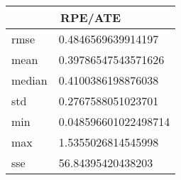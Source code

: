 \begin{table}[!ht] 
 \centering 
 \begin{tabular}{|l|l|} \hline 
 \multicolumn{2}{|c|}{RPE/ATE} \\ \hline 
 rmse & 0.4846569639914197 \\ \hline 
mean & 0.39786547543571626 \\ \hline 
median & 0.4100386198876038 \\ \hline 
std & 0.2767588051023701 \\ \hline 
min & 0.048596601022498714 \\ \hline 
max & 1.5355026814545998 \\ \hline 
sse & 56.84395420438203 \\ \hline 
\end{tabular} 
 \end{table}